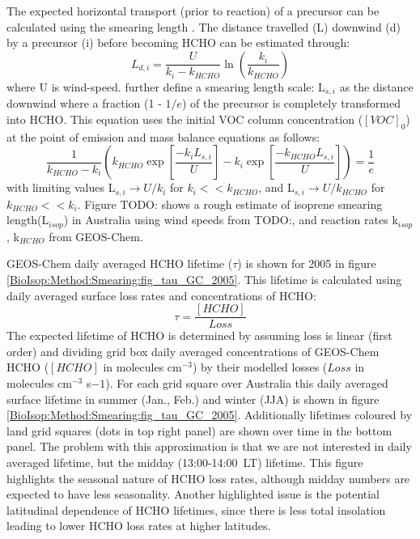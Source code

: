       The expected horizontal transport (prior to reaction) of a precursor can be calculated using the smearing length \parencite{Palmer2003}.
      The distance travelled (L) downwind (d) by a precursor (i) before becoming HCHO can be estimated through:
      \begin{equation*}
        L_{d,i} = \frac{U}{k_i - k_{HCHO}} \ln{ \left( \frac{k_i}{k_{HCHO}} \right) }
      \end{equation*}
      where U is wind-speed.
      \textcite{Palmer2003} further define a smearing length scale: L$_{s,i}$ as the distance downwind where a fraction (1 - $1/e$) of the precursor is completely transformed into HCHO.
      This equation uses the initial VOC column concentration ($[VOC]_0$) at the point of emission and mass balance equations as follows:
      \begin{equation}
      \frac{1}{k_{HCHO}-k_i} \left( k_{HCHO} \exp{ \left[ \frac{-k_i L_{s,i}}{U} \right]} -k_i \exp{ \left[ \frac{-k_{HCHO} L_{s,i}}{U} \right]} \right) = \frac{1}{e} 
      \end{equation}
      with limiting values L$_{s,i} \rightarrow U/k_i$ for $k_i << k_{HCHO}$, and L$_{s,i} \rightarrow U/k_{HCHO}$ for $k_{HCHO} << k_i$.
      Figure TODO: shows a rough estimate of isoprene smearing length(L$_{isop}$) in Australia using wind speeds from TODO:, and reaction rates k$_{isop}$, k$_{HCHO}$ from GEOS-Chem.
      
      GEOS-Chem daily averaged HCHO lifetime ($\tau$) is shown for 2005 in figure \ref{BioIsop:Method:Smearing:fig_tau_GC_2005}.
      This lifetime is calculated using daily averaged surface loss rates and concentrations of HCHO:
      \begin{equation*}
      \tau = \frac{[HCHO]}{Loss}
      \end{equation*}
      The expected lifetime of HCHO is determined by assuming loss is linear (first order) and dividing grid box daily averaged concentrations of GEOS-Chem HCHO ($[HCHO]$ in molecules cm$^{-3}$) by their modelled losses ($Loss$ in molecules cm$^{-3}$ s${-1}$).
      For each grid square over Australia this daily averaged surface lifetime in summer (Jan., Feb.) and winter (JJA) is shown in figure \ref{BioIsop:Method:Smearing:fig_tau_GC_2005}.
      Additionally lifetimes coloured by land grid squares (dots in top right panel) are shown over time in the bottom panel.
      The problem with this approximation is that we are not interested in daily averaged lifetime, but the midday (13:00-14:00~LT) lifetime.
      This figure highlights the seasonal nature of HCHO loss rates, although midday numbers are expected to have less seasonality.
      Another highlighted issue is the potential latitudinal dependence of HCHO lifetimes, since there is less total insolation leading to lower HCHO loss rates at higher latitudes.
      
